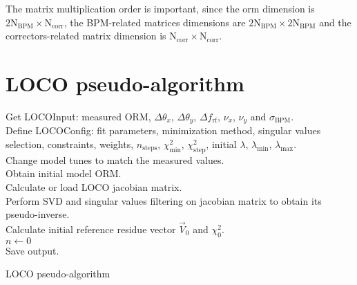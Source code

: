The matrix multiplication order is important, since the \gls{orm} dimension is $2\mathrm{N}_{\mathrm{BPM}} \times \mathrm{N}_{\mathrm{corr}}$, the BPM-related matrices dimensions are $2\mathrm{N}_{\mathrm{BPM}} \times 2\mathrm{N}_{\mathrm{BPM}}$ and the correctors-related matrix dimension is $\mathrm{N}_{\mathrm{corr}} \times \mathrm{N}_{\mathrm{corr}}$. 

\chapter{LOCO pseudo-algorithm}\label{appendix:algo}
\begin{algorithm}[h!]
\SetAlgoLined
{}
 Get LOCOInput: measured ORM, $\Delta \theta_x$, $\Delta \theta_y$, $\Delta f_{\mathrm{rf}}$, $\nu_x$, $\nu_y$ and $\sigma_{\mathrm{BPM}}$.\\
 Define LOCOConfig: fit parameters, minimization method, singular values selection, constraints, weights, $n_{\mathrm{steps}}$, $\chi^2_{\mathrm{min}}$, $\chi^2_{\mathrm{step}}$, initial $\lambda$, $\lambda_{\mathrm{min}}$, $\lambda_{\mathrm{max}}$.\\
 Change model tunes to match the measured values.\\
 Obtain initial model ORM.\\
 Calculate or load LOCO jacobian matrix.\\
 Perform SVD and singular values filtering on jacobian matrix to obtain its pseudo-inverse.\\
 Calculate initial reference residue vector $\vec{V}_0$ and $\chi^2_0$.\\
 $n \leftarrow 0$ \\
 Save output.
 \caption{LOCO pseudo-algorithm}
 \label{algo:loco}
\end{algorithm}
